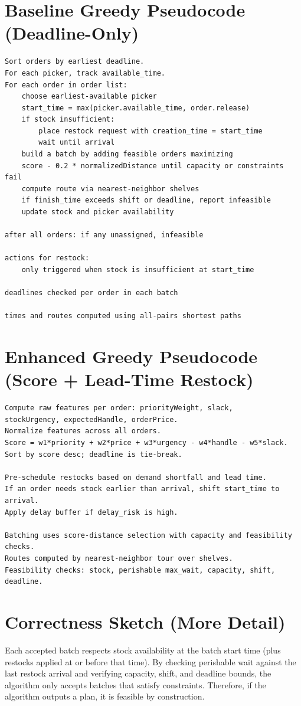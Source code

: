 \documentclass[11pt]{article}
\begin{document}
\section{Baseline Greedy Pseudocode (Deadline-Only)}
\begin{verbatim}
Sort orders by earliest deadline.
For each picker, track available_time.
For each order in order list:
    choose earliest-available picker
    start_time = max(picker.available_time, order.release)
    if stock insufficient:
        place restock request with creation_time = start_time
        wait until arrival
    build a batch by adding feasible orders maximizing
    score - 0.2 * normalizedDistance until capacity or constraints fail
    compute route via nearest-neighbor shelves
    if finish_time exceeds shift or deadline, report infeasible
    update stock and picker availability

after all orders: if any unassigned, infeasible

actions for restock:
    only triggered when stock is insufficient at start_time

deadlines checked per order in each batch

times and routes computed using all-pairs shortest paths
\end{verbatim}

\section{Enhanced Greedy Pseudocode (Score + Lead-Time Restock)}
\begin{verbatim}
Compute raw features per order: priorityWeight, slack,
stockUrgency, expectedHandle, orderPrice.
Normalize features across all orders.
Score = w1*priority + w2*price + w3*urgency - w4*handle - w5*slack.
Sort by score desc; deadline is tie-break.

Pre-schedule restocks based on demand shortfall and lead time.
If an order needs stock earlier than arrival, shift start_time to arrival.
Apply delay buffer if delay_risk is high.

Batching uses score-distance selection with capacity and feasibility checks.
Routes computed by nearest-neighbor tour over shelves.
Feasibility checks: stock, perishable max_wait, capacity, shift, deadline.
\end{verbatim}

\section{Correctness Sketch (More Detail)}
Each accepted batch respects stock availability at the batch start time (plus restocks applied at or before that time). By checking perishable wait against the last restock arrival and verifying capacity, shift, and deadline bounds, the algorithm only accepts batches that satisfy constraints. Therefore, if the algorithm outputs a plan, it is feasible by construction.
\end{document}
